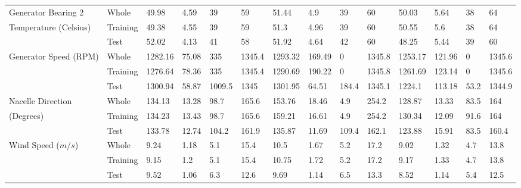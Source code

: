 \begin{landscape}
\begin{scriptsize}
\begin{center}
\begin{longtable}[htb!]{llllll|llll|llll}
Generator Bearing 2                      & Whole                    & 49.98   & 4.59   & 39     & 59     & 51.44   & 4.9    & 39    & 60     & 50.03   & 5.64   & 38    & 64     \\
Temperature (Celsius)                    & Training                 & 49.38   & 4.55   & 39     & 59     & 51.3    & 4.96   & 39    & 60     & 50.55   & 5.6    & 38    & 64     \\
                                         & Test                     & 52.02   & 4.13   & 41     & 58     & 51.92   & 4.64   & 42    & 60     & 48.25   & 5.44   & 39    & 60     \\ \hline
Generator Speed (RPM)                    & Whole                    & 1282.16 & 75.08  & 335    & 1345.4 & 1293.32 & 169.49 & 0     & 1345.8 & 1253.17 & 121.96 & 0     & 1345.6 \\
                                         & Training                 & 1276.64 & 78.36  & 335    & 1345.4 & 1290.69 & 190.22 & 0     & 1345.8 & 1261.69 & 123.14 & 0     & 1345.6 \\
                                         & Test                     & 1300.94 & 58.87  & 1009.5 & 1345   & 1301.95 & 64.51  & 184.4 & 1345.1 & 1224.1  & 113.18 & 53.2  & 1344.9 \\ \hline
Nacelle Direction                        & Whole                    & 134.13  & 13.28  & 98.7   & 165.6  & 153.76  & 18.46  & 4.9   & 254.2  & 128.87  & 13.33  & 83.5  & 164    \\
(Degrees)                                & Training                 & 134.23  & 13.43  & 98.7   & 165.6  & 159.21  & 16.61  & 4.9   & 254.2  & 130.34  & 12.09  & 91.6  & 164    \\
                                         & Test                     & 133.78  & 12.74  & 104.2  & 161.9  & 135.87  & 11.69  & 109.4 & 162.1  & 123.88  & 15.91  & 83.5  & 160.4  \\ \hline
Wind Speed ($m/s$)                       & Whole                    & 9.24    & 1.18   & 5.1    & 15.4   & 10.5    & 1.67   & 5.2   & 17.2   & 9.02    & 1.32   & 4.7   & 13.8   \\
                                         & Training                 & 9.15    & 1.2    & 5.1    & 15.4   & 10.75   & 1.72   & 5.2   & 17.2   & 9.17    & 1.33   & 4.7   & 13.8   \\
                                         & Test                     & 9.52    & 1.06   & 6.3    & 12.6   & 9.69    & 1.14   & 6.5   & 13.3   & 8.52    & 1.14   & 5.4   & 12.5   \\ \hline
\end{longtable}
\end{center}
\end{scriptsize}
\end{landscape}

